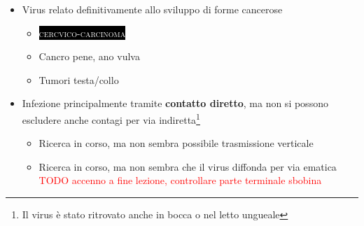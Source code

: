 \documentclass[italian,]{article}
\providecommand{\tightlist}{%
  \setlength{\itemsep}{0pt}\setlength{\parskip}{0pt}}
\newcommand{\pat}[1]{\colorbox{black}{\textcolor{white}{\textsc{#1}}}}
\newcommand{\TODO}[1]{\textcolor{red}{\textsf{\footnotesize{TODO #1}}}} %
\begin{document}
\begin{itemize}
\tightlist
\item
  Virus relato definitivamente allo sviluppo di forme cancerose

  \begin{itemize}
  \item
    \pat{cercvico-carcinoma}
  \item
    Cancro pene, ano vulva
  \item
    Tumori testa/collo
  \end{itemize}
\item
  Infezione principalmente tramite \textbf{contatto diretto}, ma non si
  possono escludere anche contagi per via indiretta\footnote{Il virus è
    stato ritrovato anche in bocca o nel letto ungueale}

  \begin{itemize}
  \tightlist
  \item
    Ricerca in corso, ma non sembra possibile trasmissione verticale
  \item
    Ricerca in corso, ma non sembra che il virus diffonda per via
    ematica
    \TODO{accenno a fine lezione, controllare parte terminale sbobina}
  \end{itemize}
\end{itemize}
\end{document}
